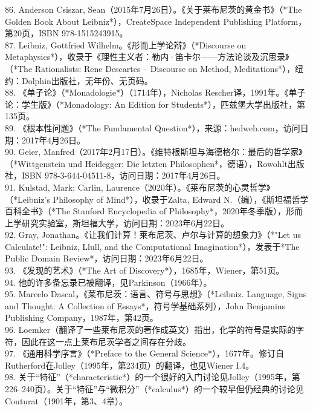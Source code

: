 86. Anderson Csiszar, Sean（2015年7月26日）。《关于莱布尼茨的黄金书》（*The Golden Book About Leibniz*），CreateSpace Independent Publishing Platform，第20页，ISBN 978-1515243915。\\
87. Leibniz, Gottfried Wilhelm。《形而上学论辩》（*Discourse on Metaphysics*），收录于《理性主义者：勒内·笛卡尔——方法论谈及沉思录》（*The Rationalists: Rene Descartes – Discourse on Method, Meditations*），纽约：Dolphin出版社，无年份、无页码。\\
88. 《单子论》（*Monadologie*）（1714年），Nicholas Rescher译，1991年。《单子论：学生版》（*Monadology: An Edition for Students*），匹兹堡大学出版社，第135页。\\ 
89. 《根本性问题》（*The Fundamental Question*），来源：hedweb.com，访问日期：2017年4月26日。\\
90. Geier, Manfred（2017年2月17日）。《维特根斯坦与海德格尔：最后的哲学家》（*Wittgenstein und Heidegger: Die letzten Philosophen*，德语），Rowohlt出版社，ISBN 978-3-644-04511-8，访问日期：2017年4月26日。\\
91. Kulstad, Mark; Carlin, Laurence（2020年）。《莱布尼茨的心灵哲学》（*Leibniz's Philosophy of Mind*），收录于Zalta, Edward N.（编），《斯坦福哲学百科全书》（*The Stanford Encyclopedia of Philosophy*，2020年冬季版），形而上学研究实验室，斯坦福大学，访问日期：2023年6月22日。\\
92. Gray, Jonathan。《让我们计算！莱布尼茨、卢尔与计算的想象力》（*"Let us Calculate!": Leibniz, Llull, and the Computational Imagination*），发表于*The Public Domain Review*，访问日期：2023年6月22日。\\
93. 《发现的艺术》（*The Art of Discovery*），1685年，Wiener，第51页。\\
94. 他的许多备忘录已被翻译，见Parkinson（1966年）。\\
95. Marcelo Dascal，《莱布尼茨：语言、符号与思想》（*Leibniz. Language, Signs and Thought: A Collection of Essays*，符号学基础系列），John Benjamins Publishing Company，1987年，第42页。\\
96. Loemker（翻译了一些莱布尼茨的著作成英文）指出，化学的符号是实际的字符，因此在这一点上莱布尼茨学者之间存在分歧。\\
97. 《通用科学序言》（*Preface to the General Science*），1677年。修订自Rutherford在Jolley（1995年，第234页）的翻译，也见Wiener I.4。\\
98. 关于“特征”（*characteristic*）的一个很好的入门讨论见Jolley（1995年，第226–240页）。关于“特征”与“微积分”（*calculus*）的一个较早但仍经典的讨论见Couturat（1901年，第3、4章）。\\
